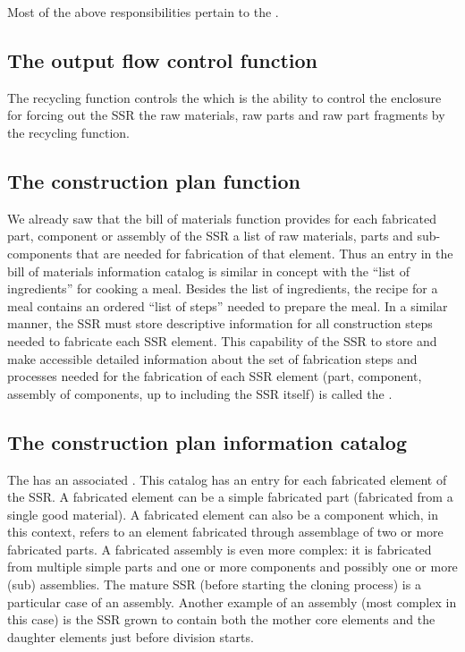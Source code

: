 Most of the above responsibilities pertain to the .

\subsection[The output flow control function]{The output flow control
function}

The recycling function controls
the  which is the ability to
control the enclosure  for forcing out the SSR
the raw materials, raw parts and raw part fragments  
by the recycling function.

\subsection[The construction plan function]{The construction plan
function}

We already saw that the bill of
materials function provides for each fabricated part, component or
assembly of the SSR a list of raw materials, parts and sub-components
that are needed for fabrication of that element. Thus an entry in the
bill of materials information catalog is similar in concept with the
“list of ingredients” for cooking a meal. Besides the list of
ingredients, the recipe for a meal contains an ordered “list of steps”
needed to prepare the meal. In a similar manner, the SSR must store
descriptive information for all construction steps needed to fabricate
each SSR element. This capability of the SSR to store and make
accessible detailed information about the set of fabrication steps and
processes needed for the fabrication of each SSR element (part,
component, assembly of components, up to including the SSR itself) is
called the .

\subsection[The construction plan information catalog]{The construction
plan information catalog}

The  has an associated . 
This catalog has an entry for each fabricated element of the
SSR. A fabricated element can be a simple fabricated part (fabricated
from a single good material). A fabricated element can also be a
component which, in this context, refers to an element fabricated
through assemblage of two or more fabricated parts. A fabricated
assembly is even more complex: it is fabricated from multiple simple
parts and one or more components and possibly one or more (sub)
assemblies. The mature SSR (before starting the cloning process) is a
particular case of an assembly. Another example of an assembly (most
complex in this case) is the SSR grown to contain both the mother core
elements and the daughter elements just before division starts. 

